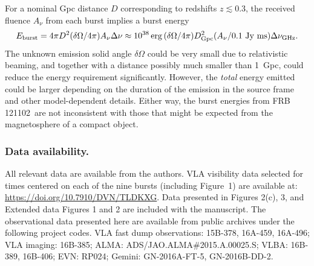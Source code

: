 \documentclass{nature_frb}
\newcommand{\frb}{FRB\,121102}
\begin{document}
For a nominal Gpc distance $D$ corresponding to redshifts $z\lesssim 0.3$, the received fluence $A_{\nu}$ from each burst implies  a burst energy
$$E_{\rm burst} = 4\pi D^2 (\delta\Omega/4\pi) A_{\nu} \Delta\nu
\approx 10^{38}\, {\rm erg}\,(\delta\Omega/4\pi) D_{\rm Gpc}^2  (A_{\nu} / 0.1\ {\rm Jy\ ms}) \Delta\nu_{\rm GHz}.$$
The unknown emission solid angle $\delta\Omega$
could be very small due to relativistic beaming, and together with a distance possibly much smaller than 1~Gpc, could reduce the energy requirement significantly.  However, the {\it total} energy emitted could be larger depending on the duration of the emission in the source frame and other model-dependent details.
Either way, the burst energies from \frb\ are not inconsistent with those that might be expected from the magnetosphere of a compact object\cite{cw16}.

\subsubsection*{Data availability.}
All relevant data are available from the authors.
VLA visibility data selected for times centered on each of the nine bursts (including Figure~1) are available at: \url{https://doi.org/10.7910/DVN/TLDKXG}. Data presented in Figures 2(c), 3, and Extended data Figures 1 and 2 are included with the manuscript.
The observational data presented here are available from public archives under the following project codes.
VLA fast dump observations: 15B-378, 16A-459, 16A-496;
VLA imaging: 16B-385;
ALMA: ADS/JAO.ALMA\#2015.A.00025.S;
VLBA: 16B-389, 16B-406;
EVN: RP024;
Gemini: GN-2016A-FT-5, GN-2016B-DD-2.
\end{document}
